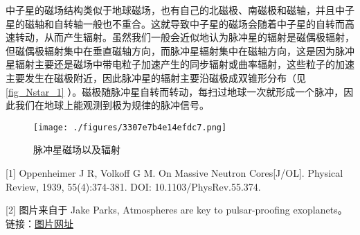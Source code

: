 中子星的磁场结构类似于地球磁场，也有自己的北磁极、南磁极和磁轴，并且中子星的磁轴和自转轴一般也不重合。这就导致中子星的磁场会随着中子星的自转而高速转动，从而产生辐射。虽然我们一般会近似地认为脉冲星的辐射是磁偶极辐射，但磁偶极辐射集中在垂直磁轴方向，而脉冲星辐射集中在磁轴方向，这是因为脉冲星辐射主要还是磁场中带电粒子加速产生的同步辐射或曲率辐射，这些粒子的加速主要发生在磁极附近，因此脉冲星的辐射主要沿磁极成双锥形分布（见\autoref{fig_Nstar_1} ）。磁极随脉冲星自转而转动，每扫过地球一次就形成一个脉冲，因此我们在地球上能观测到极为规律的脉冲信号。
\begin{figure}[ht]
\centering
\texttt{[image: ./figures/3307e7b4e14efdc7.png]}
\caption{脉冲星磁场以及辐射} \label{fig_Nstar_1}
\end{figure}

[1] Oppenheimer J R, Volkoff G M. On Massive Neutron Cores[J/OL]. Physical Review, 1939, 55(4):374-381. DOI: 10.1103/PhysRev.55.374.

[2] 图片来自于  Jake Parks, Atmospheres are key to pulsar-proofing exoplanets。链接：\href{https://www.astronomy.com/science/atmospheres-are-key-to-pulsar-proofing-exoplanets/}{图片网址}